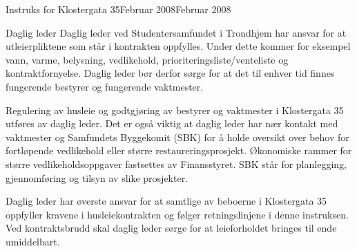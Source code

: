 \documentclass[fsbok.tex]{subfiles}
\begin{document}
\begin{instruks}{Instruks for Klostergata 35}{Februar 2008}{Februar 2008}
    \begin{instruksledd}{Daglig leder}
        Daglig leder ved Studentersamfundet i Trondhjem har ansvar for at utleierpliktene
        som står i kontrakten oppfylles.
        Under dette kommer for eksempel vann, varme, belysning, vedlikehold,
        prioriteringsliste/venteliste og
        kontraktfornyelse. Daglig leder bør derfor sørge for at det til enhver tid finnes
        fungerende bestyrer og fungerende
        vaktmester.

        Regulering av husleie og godtgjøring av bestyrer og vaktmester i Klostergata 35
        utføres av daglig leder.
        Det er også viktig at daglig leder har nær kontakt med vaktmester og Samfundets
        Byggekomit (SBK) for å holde
        oversikt over behov for fortløpende vedlikehold eller større
        restaureringsprosjekt. Økonomiske rammer for større
        vedlikeholdsoppgaver fastsettes av Finansstyret. SBK står for planlegging,
        gjennomføring og tilsyn av slike
        prosjekter.

        Daglig leder har øverste ansvar for at samtlige av beboerne i Klostergata 35
        oppfyller kravene i husleiekontrakten og
        følger retningslinjene i denne instruksen. Ved kontraktsbrudd skal daglig leder
        sørge for at leieforholdet bringes til
        ende umiddelbart.

    \end{instruksledd}
\end{instruks}
\end{document}
